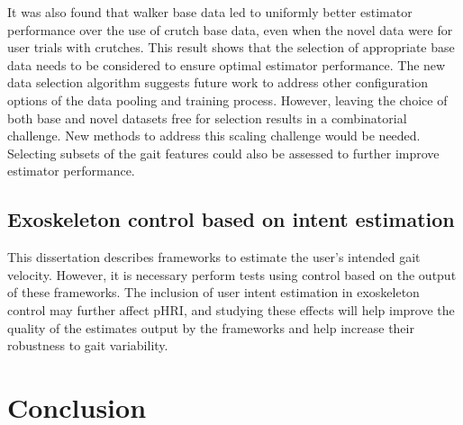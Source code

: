 It was also found that walker base data led to uniformly better estimator performance over the use of crutch base data, even when the novel data were for user trials with crutches. This result shows that the selection of appropriate base data needs to be considered to ensure optimal estimator performance. The new data selection algorithm suggests future work to address other configuration options of the data pooling and training process. However, leaving the choice of both base and novel datasets free for selection results in a combinatorial challenge. New methods to address this scaling challenge would be needed. Selecting subsets of the gait features could also be assessed to further improve estimator performance.

\subsection{Exoskeleton control based on intent estimation}

This dissertation describes frameworks to estimate the user's intended gait velocity. However, it is necessary perform tests using control based on the output of these frameworks. The inclusion of user intent estimation in exoskeleton control may further affect pHRI, and studying these effects will help improve the quality of the estimates output by the frameworks and help increase their robustness to gait variability.

\section{Conclusion}
%

